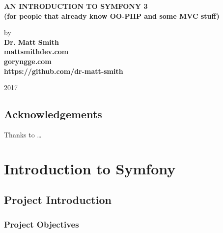 \documentclass[10pt,a4paperpaper,openright]{book}
\date{}
\begin{document}
\begin{titlepage}
    \begin{center}
    
        \vspace*{1cm}
        

       \large{ \textbf{ \uppercase{An Introduction to Symfony 3}\\(for people that already know OO-PHP and some MVC stuff)}}
        
        \vspace{1.5cm}

        by\\
        \textbf{
        Dr. Matt Smith\\mattsmithdev.com\\goryngge.com\\https://github.com/dr-matt-smith
        }

       

        
        
        \vfill
  
            2017

     \end{center}
    \thispagestyle{empty}
\end{titlepage}

\newpage

\thispagestyle{empty} \mbox{}

\frontmatter

\chapter{Acknowledgements}

Thanks to \ldots{} \tableofcontents

\mainmatter

\part{Introduction to Symfony}

\chapter{Project Introduction}\label{project-introduction}

\section{Project Objectives}\label{project-objectives}
\end{document}
